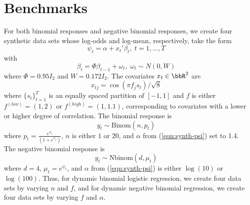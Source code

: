 \documentclass[12pt]{article}
\begin{document}

\section{Benchmarks}
\label{sec:benchmark-details}


For both binomial responses and negative binomial responses, we create four
synthetic data sets whose log-odds and log-mean, respectively, take the form
\begin{equation}
\label{eqn:synth-psi}
\psi_t = \alpha + x_t' \beta_t, \; t = 1, \ldots, T
\end{equation}
with
\[
\beta_t = \Phi \beta_{t-1} + \omega_t, \; \omega_t \sim N(0, W)
\]
where $\Phi = 0.95 I_2$ and $W = 0.172 I_2$.  The covariates $x_t \in \bbR^2$
are 
\[
x_{tj} = \cos(\pi f_j s_t) / \sqrt{8}
\]
where $\{s_t\}_{t=1}^T$ is an equally spaced partition of $[-1,1]$ and $f$ is
either $f^{(low)} = (1,2)$ or $f^{(high)} = (1,1.1)$, corresponding to
covariates with a lower or higher degree of correlation.  The binomial response
is
\[
y_t \sim \text{Binom}(n, p_t)
\]
where $p_t = \frac{e^{\psi_t}}{(1+e^{\psi_t})}$, $n$ is either $1$ or $20$, and
$\alpha$ from (\ref{eqn:synth-psi}) set to 1.4.  The negative binomial response
is
\[
y_t \sim \text{Nbinom}(d, \mu_t)
\]
where $d=4$, $\mu_t = e^{\psi_t}$, and $\alpha$ from (\ref{eqn:synth-psi}) is
either $\log(10)$ or $\log(100)$.  Thus, for dynamic binomial logistic
regression, we create four data sets by varying $n$ and $f$, and for dynamic
negative binomial regression, we create four data sets by varying $f$ and
$\alpha$.
\end{document}
